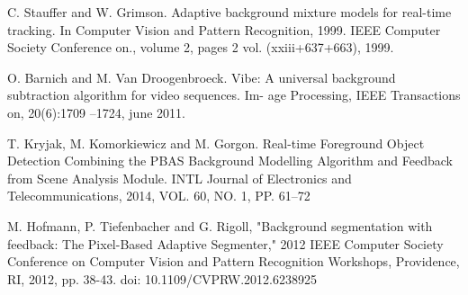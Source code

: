 \begin{thebibliography}{9}

C. Stauffer and W. Grimson. Adaptive background mixture
models for real-time tracking. In Computer Vision and Pattern Recognition, 1999.
IEEE Computer Society Conference on., volume 2, pages 2 vol. (xxiii+637+663), 1999.

O. Barnich and M. Van Droogenbroeck. Vibe: A universal
background subtraction algorithm for video sequences. Im-
age Processing, IEEE Transactions on, 20(6):1709 –1724,
june 2011.
 
T. Kryjak, M. Komorkiewicz and M. Gorgon.
Real-time Foreground Object Detection Combining
the PBAS Background Modelling Algorithm
and Feedback from Scene Analysis Module.
INTL Journal of Electronics and Telecommunications, 2014, VOL. 60, NO. 1, PP. 61–72

M. Hofmann, P. Tiefenbacher and G. Rigoll, "Background segmentation with feedback: The Pixel-Based Adaptive Segmenter," 2012 IEEE Computer Society Conference on Computer Vision and Pattern Recognition Workshops, Providence, RI, 2012, pp. 38-43.
doi: 10.1109/CVPRW.2012.6238925

\end{thebibliography}